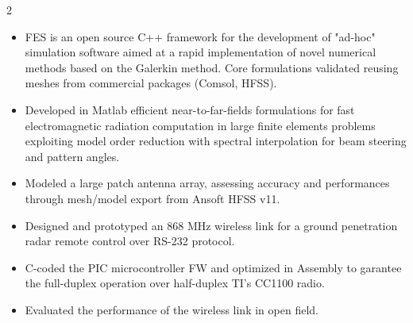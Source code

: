 \documentclass[9pt,a4paper,ragged2e,withhyper]{altacv} %
\begin{document}
\begin{paracol}{2}
\begin{itemize}
\item FES is an open source C++ framework for the development of "ad-hoc" simulation software aimed at a rapid implementation of novel numerical methods based on the Galerkin method. Core formulations validated reusing meshes from commercial packages (Comsol, HFSS).
\end{itemize}
\divider

\begin{itemize}
\item Developed in Matlab efficient near-to-far-fields formulations for fast electromagnetic radiation computation in large finite elements problems exploiting model order reduction with spectral interpolation for beam steering and pattern angles.
\item Modeled a large patch antenna array, assessing accuracy and performances through mesh/model export from Ansoft HFSS v11.
\end{itemize}
\divider

\begin{itemize}
\item Designed and prototyped an 868 MHz wireless link for a ground penetration radar remote control over RS-232 protocol.
\item C-coded the PIC microcontroller FW and optimized in Assembly to garantee the full-duplex operation over half-duplex TI’s CC1100 radio.
\item Evaluated the performance of the wireless link in open field.
\end{itemize}





\end{paracol}
\end{document}

